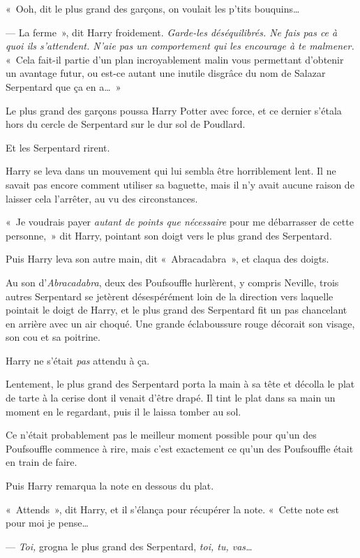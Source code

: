 «~Ooh, dit le plus grand des garçons, on voulait les p'tits bouquins…

--- La ferme~», dit Harry froidement. \emph{Garde-les déséquilibrés. Ne fais pas ce à quoi ils s'attendent. N'aie pas un comportement qui les encourage à te malmener.} «~Cela fait-il partie d'un plan incroyablement malin vous permettant d'obtenir un avantage futur, ou est-ce autant une inutile disgrâce du nom de Salazar Serpentard que ça en a…~»

Le plus grand des garçons poussa Harry Potter avec force, et ce dernier s'étala hors du cercle de Serpentard sur le dur sol de Poudlard.

Et les Serpentard rirent.

Harry se leva dans un mouvement qui lui sembla être horriblement lent. Il ne savait pas encore comment utiliser sa baguette, mais il n'y avait aucune raison de laisser cela l'arrêter, au vu des circonstances.

«~Je voudrais payer \emph{autant de points que nécessaire} pour me débarrasser de cette personne,~» dit Harry, pointant son doigt vers le plus grand des Serpentard.

Puis Harry leva son autre main, dit «~Abracadabra~», et claqua des doigts.

Au son d'\emph{Abracadabra}, deux des Poufsouffle hurlèrent, y compris Neville, trois autres Serpentard se jetèrent désespérément loin de la direction vers laquelle pointait le doigt de Harry, et le plus grand des Serpentard fit un pas chancelant en arrière avec un air choqué. Une grande éclaboussure rouge décorait son visage, son cou et sa poitrine.

Harry ne s'était \emph{pas} attendu à ça.

Lentement, le plus grand des Serpentard porta la main à sa tête et décolla le plat de tarte à la cerise dont il venait d'être drapé. Il tint le plat dans sa main un moment en le regardant, puis il le laissa tomber au sol.

Ce n'était probablement pas le meilleur moment possible pour qu'un des Poufsouffle commence à rire, mais c'est exactement ce qu'un des Poufsouffle était en train de faire.

Puis Harry remarqua la note en dessous du plat.

«~Attends~», dit Harry, et il s'élança pour récupérer la note. «~Cette note est pour moi je pense…

--- \emph{Toi,} grogna le plus grand des Serpentard, \emph{toi, tu, vas…}

